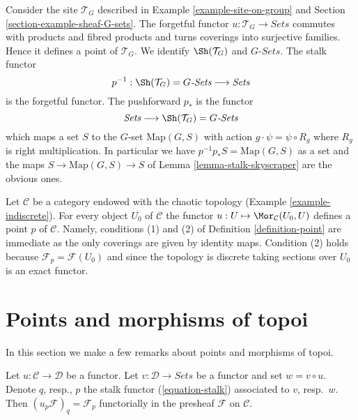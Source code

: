 \begin{example}
\label{example-point-G-sets}
Consider the site $\mathcal{T}_G$ described in
Example \ref{example-site-on-group} and
Section \ref{section-example-sheaf-G-sets}.
The forgetful functor $u : \mathcal{T}_G \to \textit{Sets}$
commutes with products and fibred products and turns
coverings into surjective families. Hence it defines a point
of $\mathcal{T}_G$. We identify $\Sh(\mathcal{T}_G)$
and $G\textit{-Sets}$. The stalk functor
$$
p^{-1} :
\Sh(\mathcal{T}_G) = G\textit{-Sets}
\longrightarrow
\textit{Sets}
$$
is the forgetful functor. The pushforward $p_*$ is the
functor
$$
\textit{Sets}
\longrightarrow
\Sh(\mathcal{T}_G) = G\textit{-Sets}
$$
which maps a set $S$ to the $G$-set $\text{Map}(G, S)$ with
action $g \cdot \psi = \psi \circ R_g$ where $R_g$ is right
multiplication. In particular we have
$p^{-1}p_*S = \text{Map}(G, S)$ as a set and the maps
$S \to \text{Map}(G, S) \to S$ of
Lemma \ref{lemma-stalk-skyscraper}
are the obvious ones.
\end{example}

\begin{example}
\label{example-indiscrete-points}
Let $\mathcal{C}$ be a category endowed with the chaotic topology
(Example \ref{example-indiscrete}). For every object $U_0$ of $\mathcal{C}$
the functor $u : U \mapsto \Mor_\mathcal{C}(U_0, U)$ defines a point
$p$ of $\mathcal{C}$. Namely, conditions (1) and (2) of
Definition \ref{definition-point} are immediate as the only coverings
are given by identity maps. Condition (2) holds because
$\mathcal{F}_p = \mathcal{F}(U_0)$ and since the topology is discrete
taking sections over $U_0$ is an exact functor.
\end{example}





\section{Points and morphisms of topoi}
\label{section-functorial-points}

\noindent
In this section we make a few remarks about points and morphisms
of topoi.

\begin{lemma}
\label{lemma-point-functor}
Let $u : \mathcal{C} \to \mathcal{D}$ be a functor. Let
$v : \mathcal{D} \to \textit{Sets}$ be a functor and set
$w = v \circ u$. Denote $q$, resp., $p$ the stalk functor
(\ref{equation-stalk}) associated to $v$, resp.\ $w$.
Then $(u_p\mathcal{F})_q = \mathcal{F}_p$ functorially in the
presheaf $\mathcal{F}$ on $\mathcal{C}$.
\end{lemma}


